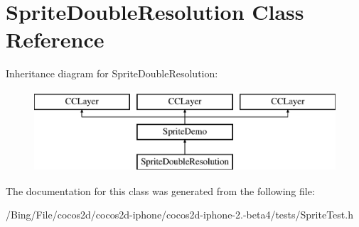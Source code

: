 \hypertarget{interface_sprite_double_resolution}{\section{Sprite\-Double\-Resolution Class Reference}
\label{interface_sprite_double_resolution}
}
Inheritance diagram for Sprite\-Double\-Resolution\-:\begin{figure}[H]
\begin{center}
\leavevmode
\includegraphics[height=3.000000cm]{interface_sprite_double_resolution}
\end{center}
\end{figure}


The documentation for this class was generated from the following file\-:\begin{DoxyCompactItemize}
\item 
/\-Bing/\-File/cocos2d/cocos2d-\/iphone/cocos2d-\/iphone-\/2.-\/beta4/tests/Sprite\-Test.\-h\end{DoxyCompactItemize}
